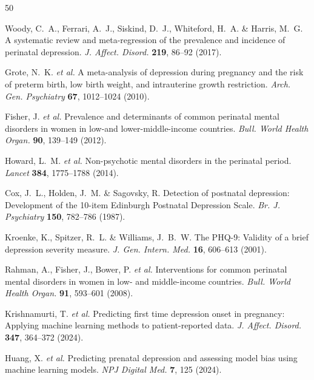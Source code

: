 \documentclass[12pt,a4paper]{article}
\begin{document}

\begin{thebibliography}{50}

 Woody, C.~A., Ferrari, A.~J., Siskind, D.~J., Whiteford, H.~A. \& Harris, M.~G. A systematic review and meta-regression of the prevalence and incidence of perinatal depression. \textit{J. Affect. Disord.} \textbf{219}, 86--92 (2017).

 Grote, N.~K. \textit{et al.} A meta-analysis of depression during pregnancy and the risk of preterm birth, low birth weight, and intrauterine growth restriction. \textit{Arch. Gen. Psychiatry} \textbf{67}, 1012--1024 (2010).

 Fisher, J. \textit{et al.} Prevalence and determinants of common perinatal mental disorders in women in low-and lower-middle-income countries. \textit{Bull. World Health Organ.} \textbf{90}, 139--149 (2012).

 Howard, L.~M. \textit{et al.} Non-psychotic mental disorders in the perinatal period. \textit{Lancet} \textbf{384}, 1775--1788 (2014).

 Cox, J.~L., Holden, J.~M. \& Sagovsky, R. Detection of postnatal depression: Development of the 10-item Edinburgh Postnatal Depression Scale. \textit{Br. J. Psychiatry} \textbf{150}, 782--786 (1987).

 Kroenke, K., Spitzer, R.~L. \& Williams, J.~B.~W. The PHQ-9: Validity of a brief depression severity measure. \textit{J. Gen. Intern. Med.} \textbf{16}, 606--613 (2001).

 Rahman, A., Fisher, J., Bower, P. \textit{et al.} Interventions for common perinatal mental disorders in women in low- and middle-income countries. \textit{Bull. World Health Organ.} \textbf{91}, 593--601 (2008).

 Krishnamurti, T. \textit{et al.} Predicting first time depression onset in pregnancy: Applying machine learning methods to patient-reported data. \textit{J. Affect. Disord.} \textbf{347}, 364--372 (2024).

 Huang, X. \textit{et al.} Predicting prenatal depression and assessing model bias using machine learning models. \textit{NPJ Digital Med.} \textbf{7}, 125 (2024).


\end{thebibliography}
\end{document}
